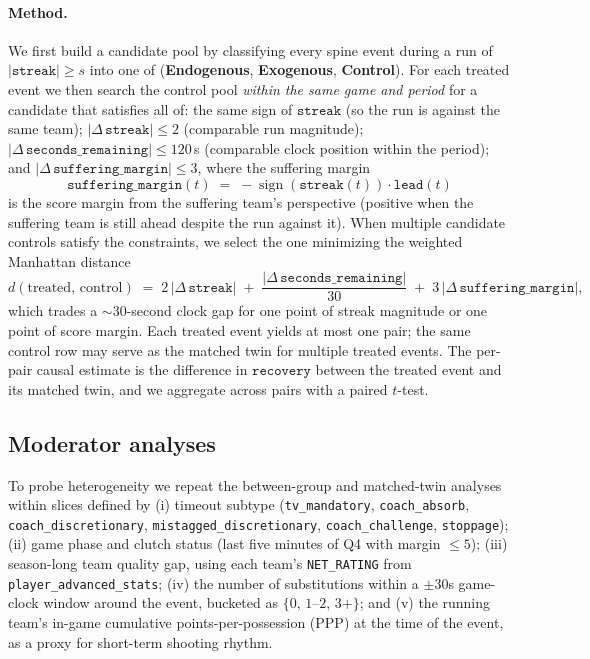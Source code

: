 \documentclass[twoside,11pt]{article}
\begin{document}
\paragraph{Method.}
We first build a candidate pool by classifying every spine event during a run of $|\texttt{streak}| \geq s$
into one of (\textbf{Endogenous}, \textbf{Exogenous}, \textbf{Control}). For each treated event we then
search the control pool \emph{within the same game and period} for a
candidate that satisfies all of: the same sign of $\texttt{streak}$ (so the run is against
the same team); $|\Delta\,\texttt{streak}| \leq 2$ (comparable run magnitude);
$|\Delta\,\texttt{seconds\_remaining}| \leq 120$\,s (comparable clock position within the period); and
$|\Delta\,\texttt{suffering\_margin}| \leq 3$, where the suffering margin
\[
		\texttt{suffering\_margin}(t) \;=\; -\operatorname{sign}(\texttt{streak}(t)) \cdot \texttt{lead}(t)
\]
is the score margin from the suffering team's perspective (positive when the suffering team is still ahead
despite the run against it). When multiple candidate controls satisfy the constraints, we select the one
minimizing the weighted Manhattan distance
\[
		d(\text{treated},\, \text{control}) \;=\; 2\,|\Delta\,\texttt{streak}|
		\;+\; \frac{|\Delta\,\texttt{seconds\_remaining}|}{30}
		\;+\; 3\,|\Delta\,\texttt{suffering\_margin}|,
\]
which trades a ${\sim}30$-second clock gap for one point of streak magnitude or one point of score margin.
Each treated event yields at most one pair; the same control row may serve as the matched twin for multiple
treated events. The per-pair causal estimate is the difference in $\texttt{recovery}$ between the treated
event and its matched twin, and we aggregate across pairs with a paired $t$-test.

\subsection{Moderator analyses}

To probe heterogeneity we repeat the between-group and matched-twin analyses within slices defined by
(i) timeout subtype (\texttt{tv\_mandatory}, \texttt{coach\_absorb}, \texttt{coach\_discretionary},
\texttt{mistagged\_discretionary}, \texttt{coach\_challenge}, \texttt{stoppage});
(ii) game phase and clutch status (last five minutes of Q4 with margin $\leq 5$);
(iii) season-long team quality gap, using each team's \texttt{NET\_RATING} from \texttt{player\_advanced\_stats};
(iv) the number of substitutions within a $\pm 30$s game-clock window around the event, bucketed as
$\{0,\, 1\text{--}2,\, 3{+}\}$; and (v) the running team's in-game cumulative points-per-possession (PPP) at
the time of the event, as a proxy for short-term shooting rhythm.
\end{document}
